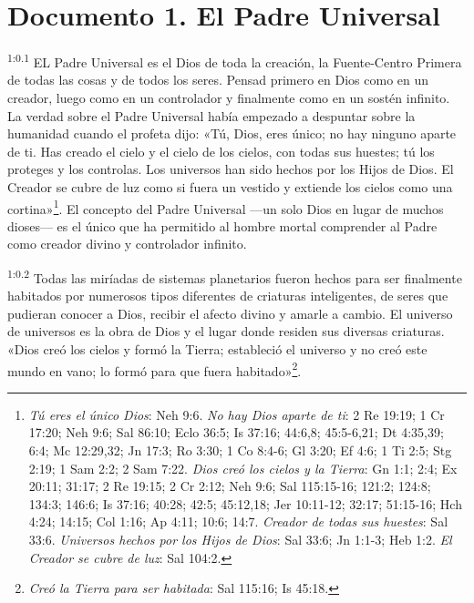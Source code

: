 \chapter{Documento 1. El Padre Universal}
\setcounter{chapter}{1}
\par
\textsuperscript{1:0.1} EL Padre Universal es el Dios de toda la creación, la Fuente-Centro Primera de todas las cosas y de todos los seres. Pensad primero en Dios como en un creador, luego como en un controlador y finalmente como en un sostén infinito. La verdad sobre el Padre Universal había empezado a despuntar sobre la humanidad cuando el profeta dijo: «Tú, Dios, eres único; no hay ninguno aparte de ti. Has creado el cielo y el cielo de los cielos, con todas sus huestes; tú los proteges y los controlas. Los universos han sido hechos por los Hijos de Dios. El Creador se cubre de luz como si fuera un vestido y extiende los cielos como una cortina»\footnote{\textit{Tú eres el único Dios}: Neh 9:6. \textit{No hay Dios aparte de ti}: 2 Re 19:19; 1 Cr 17:20; Neh 9:6; Sal 86:10; Eclo 36:5; Is 37:16; 44:6,8; 45:5-6,21; Dt 4:35,39; 6:4; Mc 12:29,32; Jn 17:3; Ro 3:30; 1 Co 8:4-6; Gl 3:20; Ef 4:6; 1 Ti 2:5; Stg 2:19; 1 Sam 2:2; 2 Sam 7:22. \textit{Dios creó los cielos y la Tierra}: Gn 1:1; 2:4; Ex 20:11; 31:17; 2 Re 19:15; 2 Cr 2:12; Neh 9:6; Sal 115:15-16; 121:2; 124:8; 134:3; 146:6; Is 37:16; 40:28; 42:5; 45:12,18; Jer 10:11-12; 32:17; 51:15-16; Hch 4:24; 14:15; Col 1:16; Ap 4:11; 10:6; 14:7. \textit{Creador de todas sus huestes}: Sal 33:6. \textit{Universos hechos por los Hijos de Dios}: Sal 33:6; Jn 1:1-3; Heb 1:2. \textit{El Creador se cubre de luz}: Sal 104:2.}. El concepto del Padre Universal ---un solo Dios en lugar de muchos dioses--- es el único que ha permitido al hombre mortal comprender al Padre como creador divino y controlador infinito.

\par
\textsuperscript{1:0.2} Todas las miríadas de sistemas planetarios fueron hechos para ser finalmente habitados por numerosos tipos diferentes de criaturas inteligentes, de seres que pudieran conocer a Dios, recibir el afecto divino y amarle a cambio. El universo de universos es la obra de Dios y el lugar donde residen sus diversas criaturas. «Dios creó los cielos y formó la Tierra; estableció el universo y no creó este mundo en vano; lo formó para que fuera habitado»\footnote{\textit{Creó la Tierra para ser habitada}: Sal 115:16; Is 45:18.}.


